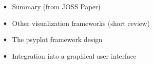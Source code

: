 

\label{chp:psyplot}



\begin{itemize}
	\item Summary (from JOSS Paper)
	\item Other visualization frameworks (short review)
	\item The psyplot framework design
	\item Integration into a graphical user interface
\end{itemize}